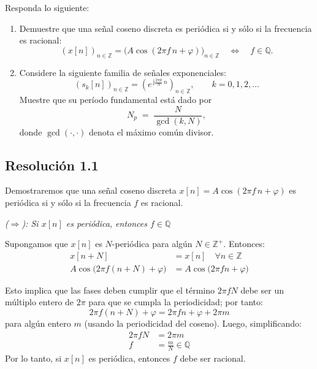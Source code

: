 \documentclass[
  11pt,
  letterpaper,
   addpoints,
   answers
  ]{exam}
\begin{document}
\begin{questions}
\question Responda lo siguiente:
\begin{enumerate}

  \item Demuestre que una señal coseno discreta es periódica si y sólo si la frecuencia es racional:
  \begin{equation}
    (x[n])_{n\in\mathbb{Z}}
    =\bigl(A\cos(2\pi f\,n+\varphi)\bigr)_{n\in\mathbb{Z}}
    \quad\Longleftrightarrow\quad f\in\mathbb{Q}.
  \end{equation}

  \item Considere la siguiente familia de señales exponenciales:
  \begin{equation}
    (s_k[n])_{n\in\mathbb{Z}}
    =\left(e^{\,\mathrm{j}\frac{2\pi k}{N}\,n}\right)_{n\in\mathbb{Z}},
    \qquad k=0,1,2,\ldots
  \end{equation}
  Muestre que su período fundamental está dado por
  \begin{equation}
    N_p \;=\; \frac{N}{\gcd(k,N)},
  \end{equation}
  donde \(\gcd(\cdot,\cdot)\) denota el máximo común divisor.
\end{enumerate}
  \begin{solution}

\subsection*{Resolución 1.1}

Demostraremos que una señal coseno discreta \(x[n] = A\cos(2\pi f\,n+\varphi)\) es periódica si y sólo si la frecuencia \(f\) es racional.

\emph{(\(\Rightarrow\)): Si \(x[n]\) es periódica, entonces \(f \in \mathbb{Q}\)}

Supongamos que \(x[n]\) es \(N\)-periódica para algún \(N \in \mathbb{Z}^+\). Entonces:
\begin{align}
x[n+N] &= x[n] \quad \forall n \in \mathbb{Z} \\
A\cos\!\big(2\pi f(n+N)+\varphi\big) &= A\cos\!\big(2\pi fn+\varphi\big)
\end{align}

Esto implica que las fases deben cumplir que el término \(2\pi fN\) debe ser un múltiplo entero de \(2\pi\) para que se cumpla la periodicidad; por tanto:
\begin{equation}
2\pi f(n+N) + \varphi = 2\pi fn + \varphi + 2\pi m
\end{equation}
para algún entero \(m\) (usando la periodicidad del coseno). Luego, simplificando:
\begin{align}
2\pi fN &= 2\pi m \\
f &= \frac{m}{N} \in \mathbb{Q}
\end{align}
Por lo tanto, si \(x[n]\) es periódica, entonces \(f\) debe ser racional.


\end{solution}
\end{questions}
\end{document}

